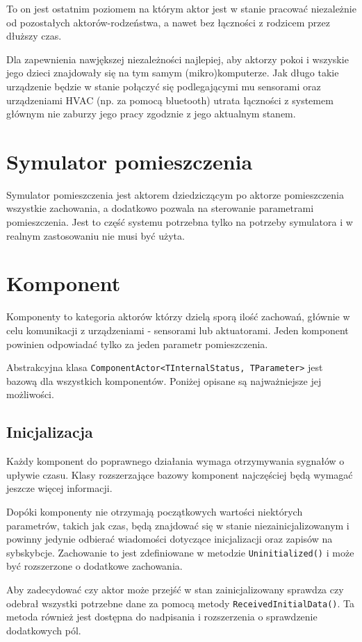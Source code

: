 To on jest ostatnim poziomem na którym aktor jest w stanie pracować niezależnie od pozostałych aktorów-rodzeństwa, a nawet bez łączności z rodzicem przez dłuższy czas. 

Dla zapewnienia nawjększej niezależności najlepiej, aby aktorzy pokoi i wszyskie jego dzieci znajdowały się na tym samym (mikro)komputerze. Jak długo takie urządzenie będzie w stanie połączyć się podlegającymi mu sensorami oraz urządzeniami HVAC (np. za pomocą bluetooth) utrata łączności z systemem głównym nie zaburzy jego pracy zgodznie z jego aktualnym stanem.

\section{Symulator pomieszczenia}

Symulator pomieszczenia jest aktorem dziedziczącym po aktorze pomieszczenia wszystkie zachowania, a dodatkowo pozwala na sterowanie parametrami pomieszczenia. Jest to część systemu potrzebna tylko na potrzeby symulatora i w realnym zastosowaniu nie musi być użyta.

\section{Komponent}
Komponenty to kategoria aktorów którzy dzielą sporą ilość zachowań, głównie w celu komunikacji z urządzeniami - sensorami lub aktuatorami. Jeden komponent powinien odpowiadać tylko za jeden parametr pomieszczenia.

Abstrakcyjna klasa \lstinline{ComponentActor<TInternalStatus, TParameter>} jest bazową dla wszystkich komponentów. Poniżej opisane są najważniejsze jej możliwości.

\subsection*{Inicjalizacja}
Każdy komponent do poprawnego działania wymaga otrzymywania sygnałów o upływie czasu. Klasy rozszerzające bazowy komponent najczęściej będą wymagać jeszcze więcej informacji. 

Dopóki komponenty nie otrzymają początkowych wartości niektórych parametrów, takich jak czas, będą znajdować się w stanie niezainicjalizowanym i powinny jedynie odbierać wiadomości dotyczące inicjalizacji oraz zapisów na sybskybcje.
Zachowanie to jest zdefiniowane w metodzie \lstinline{Uninitialized()} i może być rozszerzone o dodatkowe zachowania.

Aby zadecydować czy aktor może przejść w stan zainicjalizowany sprawdza czy odebrał wszystki potrzebne dane za pomocą metody \lstinline{ReceivedInitialData()}. Ta metoda również jest dostępna do nadpisania i rozszerzenia o sprawdzenie dodatkowych pól.

